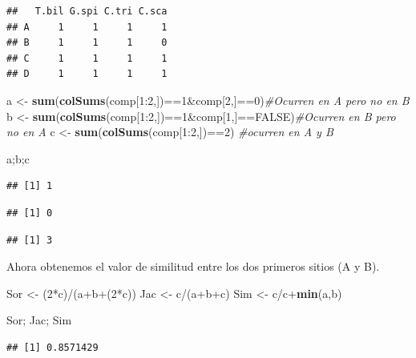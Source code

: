 \documentclass[]{book}
\newenvironment{Shaded}{\begin{snugshade}}{\end{snugshade}}
\newcommand{\KeywordTok}[1]{\textcolor[rgb]{0.13,0.29,0.53}{\textbf{{#1}}}}
\newcommand{\DecValTok}[1]{\textcolor[rgb]{0.00,0.00,0.81}{{#1}}}
\newcommand{\StringTok}[1]{\textcolor[rgb]{0.31,0.60,0.02}{{#1}}}
\newcommand{\CommentTok}[1]{\textcolor[rgb]{0.56,0.35,0.01}{\textit{{#1}}}}
\newcommand{\OtherTok}[1]{\textcolor[rgb]{0.56,0.35,0.01}{{#1}}}
\newcommand{\NormalTok}[1]{{#1}}
\begin{document}
\begin{verbatim}
##   T.bil G.spi C.tri C.sca
## A     1     1     1     1
## B     1     1     1     0
## C     1     1     1     1
## D     1     1     1     1
\end{verbatim}

\begin{Shaded}
\begin{Highlighting}[]
\NormalTok{a <-}\StringTok{ }\KeywordTok{sum}\NormalTok{(}\KeywordTok{colSums}\NormalTok{(comp[}\DecValTok{1}\NormalTok{:}\DecValTok{2}\NormalTok{,])==}\DecValTok{1}\NormalTok{&comp[}\DecValTok{2}\NormalTok{,]==}\DecValTok{0}\NormalTok{)}\CommentTok{#Ocurren en A pero no en B}
\NormalTok{b <-}\StringTok{ }\KeywordTok{sum}\NormalTok{(}\KeywordTok{colSums}\NormalTok{(comp[}\DecValTok{1}\NormalTok{:}\DecValTok{2}\NormalTok{,])==}\DecValTok{1}\NormalTok{&comp[}\DecValTok{1}\NormalTok{,]==}\OtherTok{FALSE}\NormalTok{)}\CommentTok{#Ocurren en B pero no en A}
\NormalTok{c <-}\StringTok{ }\KeywordTok{sum}\NormalTok{(}\KeywordTok{colSums}\NormalTok{(comp[}\DecValTok{1}\NormalTok{:}\DecValTok{2}\NormalTok{,])==}\DecValTok{2}\NormalTok{) }\CommentTok{#ocurren en A y B}

\NormalTok{a;b;c}
\end{Highlighting}
\end{Shaded}

\begin{verbatim}
## [1] 1
\end{verbatim}

\begin{verbatim}
## [1] 0
\end{verbatim}

\begin{verbatim}
## [1] 3
\end{verbatim}

Ahora obtenemos el valor de similitud entre los dos primeros sitios (A y
B).

\begin{Shaded}
\begin{Highlighting}[]
\NormalTok{Sor <-}\StringTok{ }\NormalTok{(}\DecValTok{2}\NormalTok{*c)/(a+b+(}\DecValTok{2}\NormalTok{*c))}
\NormalTok{Jac <-}\StringTok{ }\NormalTok{c/(a+b+c)}
\NormalTok{Sim <-}\StringTok{ }\NormalTok{c/c+}\KeywordTok{min}\NormalTok{(a,b)}

\NormalTok{Sor; Jac; Sim}
\end{Highlighting}
\end{Shaded}

\begin{verbatim}
## [1] 0.8571429
\end{verbatim}
\end{document}
